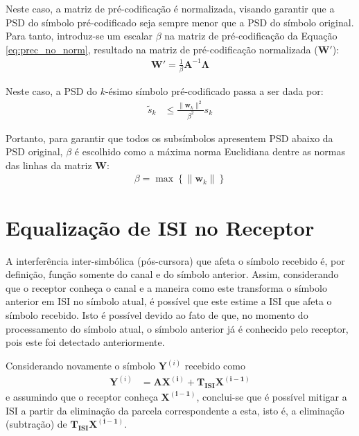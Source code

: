Neste caso, a matriz de pré-codificação é normalizada, visando garantir que a PSD do símbolo pré-codificado seja sempre menor que a PSD do símbolo original. Para tanto, introduz-se um escalar $\beta$ na matriz de pré-codificação da Equação \ref{eq:prec_no_norm}, resultado na matriz de pré-codificação normalizada ($\mathbf{W}'$):
\begin{align}
\mathbf{W}' =  \frac{1}{\beta}\mathbf{A}^{-1}\mathbf{\Lambda}
\label{eq:matriz_precoder_beta}
\end{align}

Neste caso, a PSD do $k$-ésimo símbolo pré-codificado passa a ser dada por: 
\begin{align}
\tilde{s}_k &\leq \frac{ \| \mathbf{w}_k \|^2 }{\beta^2}  s_k
\label{eq:psd_bound_norm}
\end{align}

Portanto, para garantir que todos os subsímbolos apresentem PSD abaixo da PSD original, $\beta$ é escolhido como a máxima norma Euclidiana dentre as normas das linhas da matriz $\mathbf{W}$:
\begin{align}
\beta = \max \left\{ \| \mathbf{w}_k \| \right\}
\label{eq:fator_normalizacao}
\end{align}

\section{Equalização de ISI no Receptor}
\label{sec:isi_equalization}

A interferência inter-simbólica (pós-cursora) que afeta o símbolo recebido é, por definição, função somente do canal e do símbolo anterior. Assim, considerando que o receptor conheça o canal e a maneira como este transforma o símbolo anterior em ISI no símbolo atual, é possível que este estime a ISI que afeta o símbolo recebido. Isto é possível devido ao fato de que, no momento do processamento do símbolo atual, o símbolo anterior já é conhecido pelo receptor, pois este foi detectado anteriormente.

Considerando novamente o símbolo $\mathbf{Y}^{(i)}$ recebido como
\begin{align}
\mathbf{Y}^{(i)} &= \mathbf{A} \mathbf{X^{(i)}} + \mathbf{ T_\text{ISI}} \mathbf{X^{(i-1)}} \nonumber
\end{align}
e assumindo que o receptor conheça $\mathbf{X^{(i-1)}}$, conclui-se que é possível mitigar a ISI a partir da eliminação da parcela correspondente a esta, isto é, a eliminação (subtração) de $\mathbf{ T_\text{ISI}} \mathbf{X^{(i-1)}}$.

